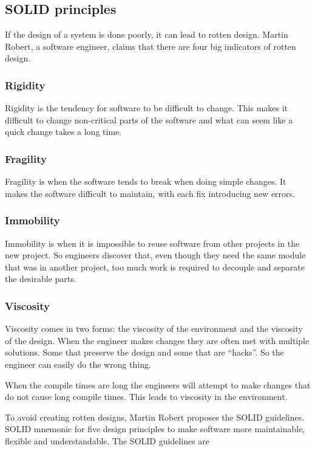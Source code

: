\documentclass[12pt]{report}
\theoremstyle{definition}
\theoremstyle{theorem}
\begin{document}
\subsection{SOLID principles}

If the design of a system is done poorly, it can lead to rotten design. Martin
Robert, a software engineer, claims that there are four big indicators of rotten
design.

\subsubsection*{Rigidity} Rigidity is the tendency for software to be difficult to
change. This makes it difficult to change non-critical parts of the software and
what can seem like a quick change takes a long time.

\subsubsection*{Fragility} Fragility is when the software tends to break when doing
simple changes. It makes the software difficult to maintain, with each fix
introducing new errors.

\subsubsection*{Immobility} Immobility is when it is impossible to reuse software from
other projects in the new project. So engineers discover that, even though they
need the same module that was in another project, too much work is required to
decouple and separate the desirable parts.

\subsubsection*{Viscosity} Viscosity comes in two forms: the viscosity of the
environment and the viscosity of the design. When the engineer makes changes
they are often met with multiple solutions. Some that preserve the design and
some that are ``hacks''. So the engineer can easily do the wrong thing.

When the compile times are long the engineers will attempt to make changes that
do not cause long compile times. This leads to viscosity in the environment.

To avoid creating rotten designs, Martin Robert proposes the SOLID guidelines.
SOLID mnemonic for five design principles to make software more maintainable,
flexible and understandable. The SOLID guidelines are
\end{document}
